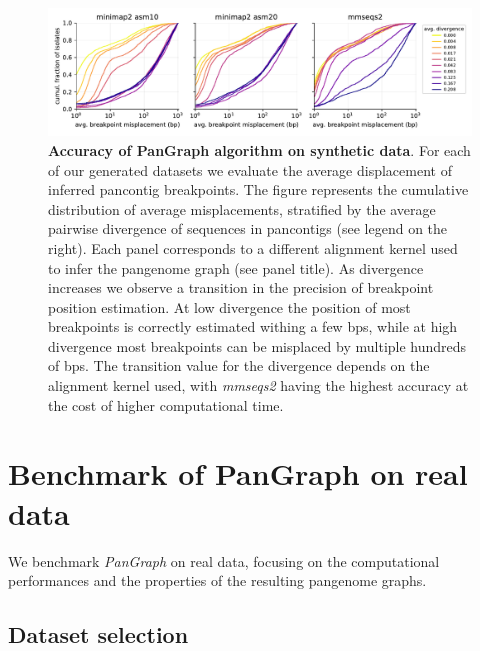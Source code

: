 \documentclass[aps,rmp,reprint,superscriptaddress,notitlepage,10pt,onecolumn]{revtex4-1}
\begin{document}
\begin{figure}[htb]
    \includegraphics[width=\textwidth]{figs_suppl/accuracy_comparison.pdf}
    \caption{{\bf Accuracy of PanGraph algorithm on synthetic data}. For each of our generated datasets we evaluate the average displacement of inferred pancontig breakpoints. The figure represents the cumulative distribution of average misplacements, stratified by the average pairwise divergence of sequences in pancontigs (see legend on the right). Each panel corresponds to a different alignment kernel used to infer the pangenome graph (see panel title). As divergence increases we observe a transition in the precision of breakpoint position estimation. At low divergence the position of most breakpoints is correctly estimated withing a few bps, while at high divergence most breakpoints can be misplaced by multiple hundreds of bps. The transition value for the divergence depends on the alignment kernel used, with \textit{mmseqs2} having the highest accuracy at the cost of higher computational time.}
    \label{fig:benchmark-accuracy-suppl}
\end{figure}

\section{Benchmark of PanGraph on real data}

We benchmark \textit{PanGraph} on real data, focusing on the computational performances and the properties of the resulting pangenome graphs.

\subsection{Dataset selection}
\end{document}
